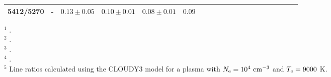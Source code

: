 \documentclass{emulateapj}
\def\unit #1{\,{\rm #1}}
\newcommand\cmcubei{\rm \,\unit{cm^{-3}}}
\begin{document}
\begin{table*}
{\begin{minipage}{9cm}
\begin{tabular}{lccccccccccccccccccc}
                                                                                                                                                                          
 5412/5270		&-	&$0.13 \pm 0.05$		&$0.10 \pm 0.01$			&$0.08 \pm 0.01$	&$0.09$						\\ 
 
 
\hline \hline
\end{tabular} 
\end{minipage}


\begin{minipage}{9cm}
\begin{flushleft}
{$^1$ \citet{2003A&A...401.1119R}. } \\
{$^2$ \citet{2009MNRAS.395..855M}. } \\
{$^3$ \citet{2000ApJS..129..229B}. } \\
{$^4$ \citet{1998MNRAS.295..401E}. } \\
{$^{5}$ Line ratios calculated using the CLOUDY3 model for a plasma with 
$N_{\rm e}=10^4 \cmcubei$ and $T_{\rm e}=9000$ K.}
\end{flushleft}
\end{minipage}


}

\end{table*}





\end{document}
